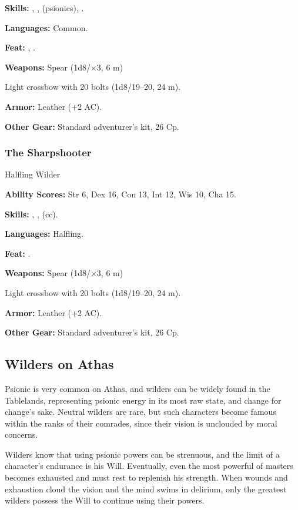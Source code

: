 \textbf{Skills:} , ,  (psionics), .

\textbf{Languages:} Common.

\textbf{Feat:} , .

\textbf{Weapons:} Spear (1d8/$\times$3, 6 m)

Light crossbow with 20 bolts (1d8/19--20, 24 m).

\textbf{Armor:} Leather (+2 AC).

\textbf{Other Gear:} Standard adventurer's kit, 26 Cp.

\subsubsection{The Sharpshooter}
Halfling Wilder

\textbf{Ability Scores:} Str 6, Dex 16, Con 13, Int 12, Wis 10, Cha 15.

\textbf{Skills:} , ,  (cc).

\textbf{Languages:} Halfling.

\textbf{Feat:} .

\textbf{Weapons:} Spear (1d8/$\times$3, 6 m)

Light crossbow with 20 bolts (1d8/19--20, 24 m).

\textbf{Armor:} Leather (+2 AC).

\textbf{Other Gear:} Standard adventurer's kit, 26 Cp.

\subsection{Wilders on Athas}

Psionic is very common on Athas, and wilders can be widely found in the Tablelands, representing psionic energy in its most raw state, and change for change's sake. Neutral wilders are rare, but such characters become famous within the ranks of their comrades, since their vision is unclouded by moral concerns.

Wilders know that using psionic powers can be strenuous, and the limit of a character's endurance is his Will. Eventually, even the most powerful of masters becomes exhausted and must rest to replenish his strength. When wounds and exhaustion cloud the vision and the mind swims in delirium, only the greatest wilders possess the Will to continue using their powers.

